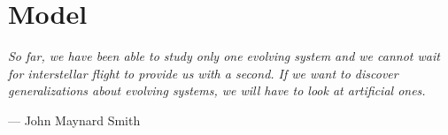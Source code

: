 \chapter{Model}
\label{chapter:model}

\epigraph{\textit{So far, we have been able to study only one evolving system and we cannot wait for interstellar flight to provide us with a second. If we want to discover generalizations about evolving systems, we will have to look at artificial ones.}}{--- \textup{John Maynard Smith}}

\minitoc[n] %





